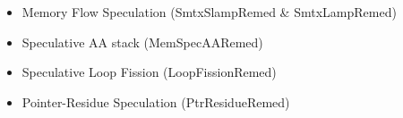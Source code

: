 \begin{itemize}


    \item Memory Flow Speculation (SmtxSlampRemed \& SmtxLampRemed)

    \item Speculative AA stack (MemSpecAARemed)

    \item Speculative Loop Fission (LoopFissionRemed)

    \item Pointer-Residue Speculation (PtrResidueRemed)
\end{itemize}

